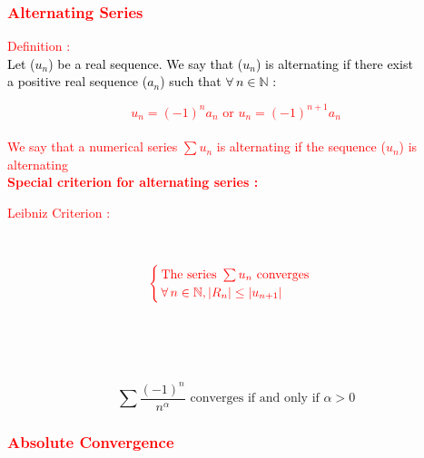 \documentclass[a4paper,12pt]{article}
\begin{document}
\textcolor{red}{\subsubsection*{Alternating Series}}
\bigskip

\textcolor{red}{Definition :}\\

\textcolor{black}{Let ($u_n$) be a real sequence. We say that ($u_n$) is alternating if there exist} \\

\textcolor{black}{a positive real sequence ($a_n$) such that $\forall \, n \in \mathbb{N}$ : }

\textcolor{red}{\[
u_n = (-1)^na_n \text{ or } u_n = (-1)^{n+1}a_n
\]} \\
\textcolor{red}{We say that a numerical series $\sum{u_n}$ is alternating if the sequence ($u_n$) is alternating}\bigskip
\bigskip
\\
\textcolor{red}{\textbf{Special criterion for alternating series :}}
\bigskip

\textcolor{red}{Leibniz Criterion :}\\

 \\

 \\

\[
\textcolor{red}{\begin{cases}
\,\text{The series }\sum{u_n} \text{ converges} \\
\,\forall \, n \in \mathbb{N}, |R_n| \leq |u_{n+1}|
\end{cases}} \\
\]\\

\\

 \\

 \\
\[
\sum{\frac{(-1)^n}{n^\alpha} \text{ converges if and only if } \alpha > 0}
\]

\newpage
\textcolor{red}{\subsubsection*{Absolute Convergence}}
\bigskip
\end{document}
